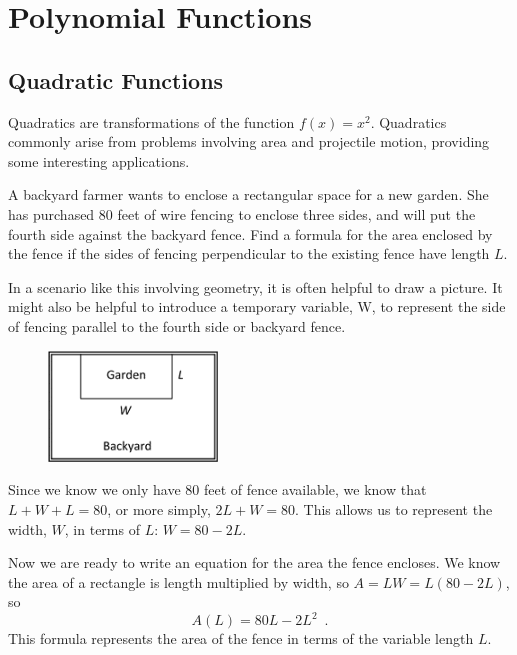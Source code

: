 \section{Polynomial Functions}
\label{sec:polynomial}

\subsection{Quadratic Functions}
\label{ssec:quadratic}

Quadratics are transformations of the function $f(x)=x^2$. Quadratics commonly arise from problems involving area and projectile motion, providing some interesting applications.

\begin{example}
A backyard farmer wants to enclose a rectangular space for a new garden. She has purchased 80 feet of wire fencing to enclose three sides, and will put the fourth side against the backyard fence. Find a formula for the area enclosed by the fence if the sides of fencing perpendicular to the existing fence have length $L$.

\begin{solution} In a scenario like this involving geometry, it is often helpful to draw a picture. It might also be helpful to introduce a temporary variable, W, to represent the side of fencing parallel to the fourth side or backyard fence.
	\begin{figure}[!ht]
	\centering
	\includegraphics[width=0.4\textwidth]{img/chap1/sec1-5/image096.png}
	\caption{}
	\end{figure}
Since we know we only have 80 feet of fence available, we know that $L+W+L=80$, or more simply, $2L+W=80$. This allows us to represent the width, $W$, in terms of $L$: $W=80-2L$.

Now we are ready to write an equation for the area the fence encloses. We know the area of a rectangle is length multiplied by width, so $A=LW=L(80-2L)$, so
$$A(L)=80L-2L^2 \enspace .$$
This formula represents the area of the fence in terms of the variable length $L$.
\end{solution}\end{example}

